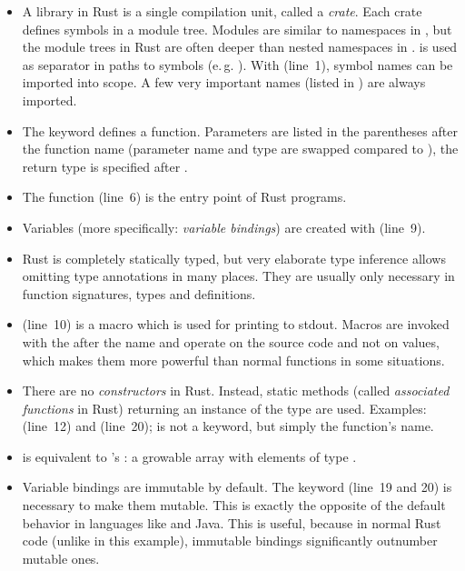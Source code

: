 \vspace{-2mm}
\begin{itemize}
  \item A library in Rust is a single compilation unit, called a \emph{crate}.
  Each crate defines symbols in a module tree.
  Modules are similar to namespaces in \cpp, but the module trees in Rust are often deeper than nested namespaces in \cpp.
  \code{::} is used as separator in paths to symbols (e.\,g. ).
  With  (line~1), symbol names can be imported into scope.
  A few very important names (listed in ) are always imported.
  \item The keyword  defines a function.
  Parameters are listed in the parentheses after the function name (parameter name and type are swapped compared to \cpp), the return type is specified after \code{->}.
  \item The  function (line~6) is the entry point of Rust programs.
  \item Variables (more specifically: \emph{variable bindings}) are created with  (line~9).
  \item Rust is completely statically typed, but very elaborate type inference allows omitting type annotations in many places.
  They are usually only necessary in function signatures, types and  definitions.
  \item {} (line~10) is a macro which is used for printing to stdout.
  Macros are invoked with the \code{!} after the name and operate on the source code and not on values, which makes them more powerful than normal functions in some situations.
  \item There are no \emph{constructors} in Rust.
  Instead, static methods (called \emph{associated functions} in Rust) returning an instance of the type are used.
  Examples:  (line~12) and   (line~20);  is not a keyword, but simply the function's name.
  \item {} is equivalent to \cpp's : a growable array with elements of type .
  \item Variable bindings are immutable by default.
  The keyword  (line~19 and 20) is necessary to make them mutable.
  This is exactly the opposite of the default behavior in languages like \cpp and Java.
  This is useful, because in normal Rust code (unlike in this example), immutable bindings significantly outnumber mutable ones.

\end{itemize}
